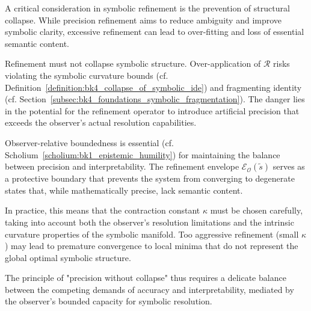 \begin{scholium}
\label{scholium:bk4_precision_without_collapse}
A critical consideration in symbolic refinement is the prevention of structural collapse. While precision refinement aims to reduce ambiguity and improve symbolic clarity, excessive refinement can lead to over-fitting and loss of essential semantic content.

Refinement must not collapse symbolic structure. Over-application of $\mathcal{R}$ risks violating the symbolic curvature bounds (cf. Definition~\ref{definition:bk4_collapse_of_symbolic_ide}) and fragmenting identity (cf. Section~\ref{subsec:bk4_foundations_symbolic_fragmentation}). The danger lies in the potential for the refinement operator to introduce artificial precision that exceeds the observer's actual resolution capabilities.

Observer-relative boundedness is essential (cf. Scholium~\ref{scholium:bk1_epistemic_humility}) for maintaining the balance between precision and interpretability. The refinement envelope $\mathcal{E}_{\mathcal{O}}(\tilde{s})$ serves as a protective boundary that prevents the system from converging to degenerate states that, while mathematically precise, lack semantic content.

In practice, this means that the contraction constant $\kappa$ must be chosen carefully, taking into account both the observer's resolution limitations and the intrinsic curvature properties of the symbolic manifold. Too aggressive refinement (small $\kappa$) may lead to premature convergence to local minima that do not represent the global optimal symbolic structure.

The principle of "precision without collapse" thus requires a delicate balance between the competing demands of accuracy and interpretability, mediated by the observer's bounded capacity for symbolic resolution.
\end{scholium}

